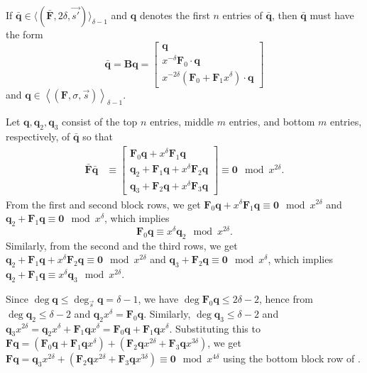 \begin{lem}
\label{lem:A_delta-1Form}If $\bar{\mathbf{q}}\in\langle(\bar{\mathbf{F}},2\delta,\vec{s'})\rangle_{\delta-1}$
and $\mathbf{q}$ denotes the first $n$ entries of $\bar{\mathbf{q}}$,
then $\bar{\mathbf{q}}$ must have the form \[
\bar{\mathbf{q}}=\mathbf{B}\mathbf{q}=\left[\begin{array}{r}
\mathbf{q}\\
x^{-\delta}\mathbf{F}_{0}\cdot\mathbf{q}\\
x^{-2\delta}\left(\mathbf{F}_{0}+\mathbf{F}_{1}x^{\delta}\right)\cdot\mathbf{q}\end{array}\right]\]
 and $\mathbf{q}\in\left\langle \left(\mathbf{F},\sigma,\vec{s}\right)\right\rangle _{\delta-1}$.\end{lem}
\begin{pf}
Let $\mathbf{q},\mathbf{q}_{2},\mathbf{q}_{3}$ consist of the top
$n$ entries, middle $m$ entries, and bottom $m$ entries, respectively,
of $\mathbf{\bar{\mathbf{q}}}$ so that \begin{align}
\bar{\mathbf{F}}\bar{\mathbf{q}} & \equiv\left[\begin{array}{r}
\mathbf{F}_{0}\mathbf{q}+x^{\delta}\mathbf{F}_{1}\mathbf{q}\\
\mathbf{q}_{2}+\mathbf{F}_{1}\mathbf{q}+x^{\delta}\mathbf{F}_{2}\mathbf{q}\\
\mathbf{q}_{3}+\mathbf{F}_{2}\mathbf{q}+x^{\delta}\mathbf{F}_{3}\mathbf{q}\end{array}\right]\equiv\mathbf{0}\mod x^{2\delta}.\label{eq:Aq}\end{align}
 From the first and second block rows, we get $\mathbf{F}_{0}\mathbf{q}+x^{\delta}\mathbf{F}_{1}\mathbf{q}\equiv\mathbf{0}\mod x^{2\delta}$
and $\mathbf{q}_{2}+\mathbf{F}_{1}\mathbf{q}\equiv\mathbf{0}\mod x^{\delta}$,
which implies \begin{equation}
\mathbf{F}_{0}\mathbf{q}\equiv x^{\delta}\mathbf{q}_{2}\mod x^{2\delta}.\label{eq:q1q2}\end{equation}
 Similarly, from the second and the third rows, we get $\mathbf{q}_{2}+\mathbf{F}_{1}\mathbf{q}+x^{\delta}\mathbf{F}_{2}\mathbf{q}\equiv\mathbf{0}\mod x^{2\delta}$
and $\mathbf{q}_{3}+\mathbf{F}_{2}\mathbf{q}\equiv\mathbf{0}\mod x^{\delta}$,
which implies $\mathbf{q}_{2}+\mathbf{F}_{1}\mathbf{q}\equiv x^{\delta}\mathbf{q}_{3}\mod x^{2\delta}$.

Since $\deg\mathbf{q}\le\deg_{\vec{s}}\mathbf{q}=\delta-1$, we have
$\deg\mathbf{F}_{0}\mathbf{q}\le2\delta-2$, hence from 
$\deg\mathbf{q}_{2}\le\delta-2$ and $\mathbf{q}_{2}x^{\delta}=\mathbf{F}_{0}\mathbf{q}$.
Similarly, $\deg\mathbf{q}_{3}\le\delta-2$ and $\mathbf{q}_{3}x^{2\delta}=\mathbf{q}_{2}x^{\delta}+\mathbf{F}_{1}\mathbf{q}x^{\delta}=\mathbf{F}_{0}\mathbf{q}+\mathbf{F}_{1}\mathbf{q}x^{\delta}$.
Substituting this to $\mathbf{F}\mathbf{q}=(\mathbf{F}_{0}\mathbf{q}+\mathbf{F}_{1}\mathbf{q}x^{\delta})+(\mathbf{F}_{2}\mathbf{q}x^{2\delta}+\mathbf{F}_{3}\mathbf{q}x^{3\delta})$,
we get $\mathbf{F}\mathbf{q}=\mathbf{q}_{3}x^{2\delta}+(\mathbf{F}_{2}\mathbf{q}x^{2\delta}+\mathbf{F}_{3}\mathbf{q}x^{3\delta})\equiv\mathbf{0}\mod x^{4\delta}$
using the bottom block row of .\end{pf}
